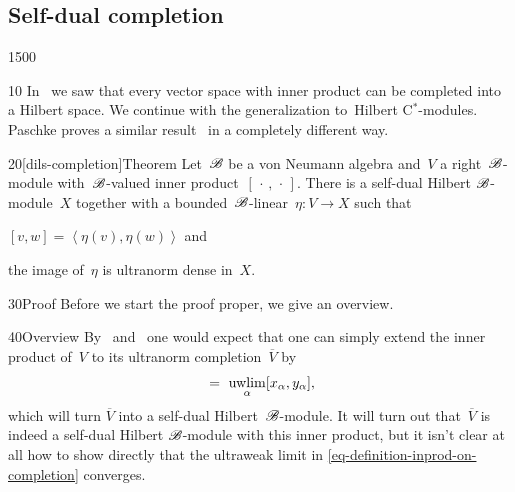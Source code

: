 \subsection{Self-dual completion}
\begin{parsec}{1500}%
\begin{point}{10}%
In~
    we saw that every vector space with inner product
    can be completed into a Hilbert space.
We continue with the generalization to~Hilbert C$^*$-modules.
Paschke proves a similar result~\cite[thm.~3.2]{paschke}
    in a completely different way.
\end{point}
\begin{point}{20}[dils-completion]{Theorem}%
Let~$\mathscr{B}$ be a von Neumann algebra
and~$V$ a right~$\mathscr{B}$-module with~$\mathscr{B}$-valued
    inner product~$[\,\cdot\,,\,\cdot\,]$.
There is a self-dual Hilbert $\mathscr{B}$-module~$X$
    together with a bounded~$\mathscr{B}$-linear~$\eta\colon V \to X$
    such that \begin{inparaenum}
    \item $[v,w] = \left<\eta (v),\eta(w)\right>$
    and \item the image of~$\eta$ is ultranorm dense in~$X$.
    \end{inparaenum}
\begin{point}{30}{Proof}%
Before we start the proof proper,
    we give an overview.
\begin{point}{40}{Overview}
By~ and~
    one would expect that
    one can simply extend the inner product of~$V$
    to its ultranorm completion~$\overline{V}$
    by
    \begin{equation}
        [(x_\alpha)_\alpha, (y_\alpha)_\alpha] \ =\  \uwlim_\alpha [x_\alpha,y_\alpha], \label{eq-definition-inprod-on-completion}
    \end{equation}
    which will turn $\overline{V}$ into a self-dual Hilbert~$\mathscr{B}$-module.
It will turn out that~$\overline{V}$
    is indeed a self-dual Hilbert $\mathscr{B}$-module
    with this inner product,
    but it isn't clear at all  how to show directly that the ultraweak limit
    in \eqref{eq-definition-inprod-on-completion} converges.


\end{point}
\end{point}
\end{point}
\end{parsec}
